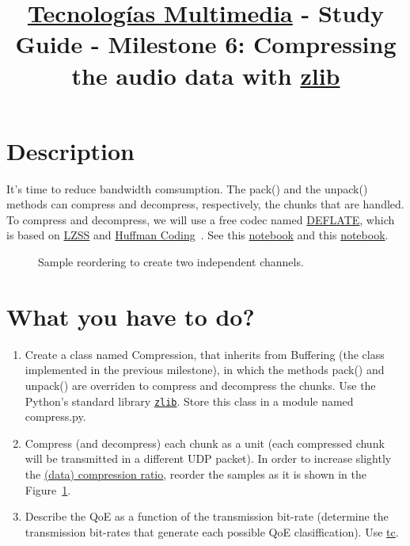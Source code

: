 \title{\href{https://www.ual.es/estudios/grados/presentacion/plandeestudios/asignatura/4015/40154321?idioma=zh_CN}{Tecnologías Multimedia} - Study Guide - Milestone 6: Compressing the audio data with \href{https://zlib.net/}{zlib}}

\maketitle

\section{Description}

It's time to reduce bandwidth comsumption. The pack() and the unpack()
methods can compress and decompress, respectively, the chunks that are
handled. To compress and decompress, we will use a free codec named
\href{https://en.wikipedia.org/wiki/DEFLATE}{DEFLATE}, which is based
on
\href{https://en.wikipedia.org/wiki/Lempel%E2%80%93Ziv%E2%80%93Storer%E2%80%93Szymanski}{LZSS}
  and \href{https://en.wikipedia.org/wiki/Huffman_coding}{Huffman
    Coding}~\cite{nelson96datacompression}. See this
  \href{https://github.com/vicente-gonzalez-ruiz/LZ77}{notebook} and
  this
  \href{https://vicente-gonzalez-ruiz.github.io/Huffman_coding/}{notebook}.

\begin{figure}
  \begin{center}
  \end{center}
  \caption{Sample reordering to create two independent channels.}
  \label{fig:reordering}
\end{figure}

\section{What you have to do?}

\begin{enumerate}
  
\item Create a class named Compression, that inherits from
  Buffering (the class implemented in the previous milestone),
  in which the methods pack() and unpack() are
  overriden to compress and decompress the chunks. Use the Python's
  standard library
  \href{https://docs.python.org/3/library/zlib.html}{\texttt{zlib}}. Store
  this class in a module named compress.py.
  
\item Compress (and decompress) each chunk as a unit (each compressed
  chunk will be transmitted in a different UDP packet). In order to
  increase slightly the
  \href{https://en.wikipedia.org/wiki/Data_compression_ratio}{(data)
    compression ratio}, reorder the samples as it is shown in the
  Figure~\ref{fig:reordering}.

\item Describe the QoE as a function of the transmission bit-rate
  (determine the transmission bit-rates that generate each possible
  QoE clasiffication). Use
  \href{https://man7.org/linux/man-pages/man8/tc.8.html}{tc}.
\end{enumerate}

